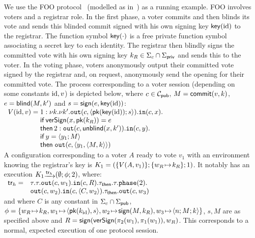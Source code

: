 \begin{example}
\label{ex:execution}
We use the FOO protocol~\cite{fujioka1992practical}
(modelled as in~\cite{vote-CSF16})
 as a running example.
FOO involves voters and a registrar role.
In the first phase, a voter commits and then blinds its vote and
sends this blinded commit signed with his own signing key $\mathsf{key}(\mathrm{id})$
to the registrar.
The function symbol $\mathsf{key}(\cdot)$ is a free
private function symbol associating a secret key to each identity.
The registrar then blindly signs the committed vote
with his own signing key $k_R\in\Sigma_c\cap\Sigma_{\mathsf{priv}}$ and sends
this to the voter.
In the voting phase, voters anonymously output their committed
vote signed by the registrar and, on request, anonymously send
the opening for their committed vote.
The process corresponding to a voter session
(depending on some constants
$\mathrm{id}, v$) is depicted below, where $c\in\mathcal{C}_{\mathsf{pub}}$,
$M = \mathsf{commit}(v,k)$, 
$ e = \mathsf{blind}(M,k')$ and
$s=\mathsf{sign}(e,\mathsf{key}(\mathrm{id}))$:\\[0.5mm]
\null\hfill
$
	\begin{array}[h]{r@{$\;$}c@{$\;$}lr}
    V(\id,v) &=&\phase{1}
                 \new k.\new k'.\Out(c, \langle \pk(\key(\id)); s\rangle). 
              \In(c, x). \\   %
             && \If\, \versign(x,\pk(k_R))=e &\\
             && \Then\, \phase{2} \Out(c,\unbl(x,k')). 
             \In(c, y). \\   %
             && \If\, y=\langle y_1 ; M\rangle \\
             && \Then\;\Out(c,\pair{y_1}{\pair{M}{k}}) &\\
  \end{array}
  $\hfill\null\\
A configuration corresponding to a voter $A$ ready to vote $v_1$
with an environment knowing the registrar's key is
$K_1=(\{V(A,v_1)\};\{w_R\!\mapsto\! k_R\};1)$.
It notably has an execution
$K_1\sint{\tr_h}(\emptyset;\phi;2)$, where:\\[0.0mm]
\null
\hfill
$
\begin{array}{rl}
\mathsf{tr}_h= & \tau.\tau.\mathtt{out}(c,w_1).\mathtt{in}(c,R).\tau_{\mathsf{then}}.\tau.\mathtt{phase}(2). \\
       & \mathtt{out}(c,w_2).\mathtt{in}(c,\langle C,w_2 \rangle).\tau_{\mathsf{then}}.\mathtt{out}(c,w_3)  \\
\end{array}
$\hfill
\null\\[0.0mm]
and where $C$ is any constant in $\Sigma_c\cap\Sigma_{\mathsf{pub}}$,
$\phi=\{
w_R\refer k_R,
w_1\refer\pair{\pk(k_\id)}{s}, 
w_2\refer \sign(M,k_R), 
w_3\refer \langle n; M; k\rangle
\}$,
$s,M$ are as specified above and
$R=\mathsf{sign}(\mathsf{verSign}(\pi_2(w_1), \pi_1(w_1)),w_R)$.
This corresponds to a normal, expected execution of one protocol
session.
\end{example}



